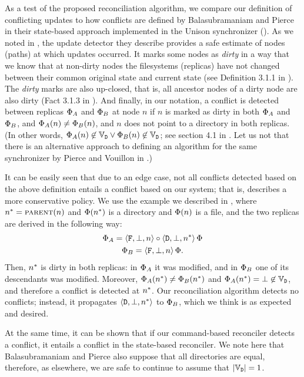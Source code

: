 As a test of the proposed reconciliation algorithm, 
we compare our definition of conflicting
updates to how conflicts are defined by Balasubramaniam and Pierce
in their state-based approach implemented in the Unison synchronizer (\cite{BP}).
As we noted in \cite{NREC}, the update detector they describe provides a safe estimate of nodes
(paths) at which updates occurred.
It marks some nodes as \emph{dirty} in a way that we know that at non-dirty nodes
the filesystems (replicas) have not changed between their common original state and current state
(see Definition 3.1.1 in \cite{BP}).
The \emph{dirty} marks are also up-closed, that is, all ancestor nodes of a dirty node
are also dirty (Fact 3.1.3 in \cite{BP}).
And finally, in our notation, 
a conflict is detected between replicas $\Phi_A$ and $\Phi_B$ at node $n$
if $n$ is marked as dirty in both $\Phi_A$ and $\Phi_B$, and
$\Phi_A(n)\neq\Phi_B(n)$, and $n$ does not point to a directory in both replicas.
(In other words, 
$\Phi_A(n)\not\in\mathbb{V}_{\mathtt{D}} \vee \Phi_B(n)\not\in\mathbb{V}_{\mathtt{D}}$; see section 4.1 in \cite{BP}.
Let us not that there is an alternative approach to defining an algorithm for
the same synchronizer by Pierce and Vouillon in \cite{PV}.)

It can be easily seen that due to an edge case, 
not all conflicts detected based on the above definition
entails a conflict based on our system; that is, \cite{BP} describes a more
conservative policy.
We use the example we described in \cite{NREC},
where $n^*=\text{\normalfont\scshape{parent}}(n)$ and $\Phi(n^*)$ is a directory and $\Phi(n)$ is a file, and
the two replicas are derived in the following way:
\begin{gather*}
\Phi_A = \langle{\mathtt{F},\bot,n}\rangle \circ \langle{\mathtt{D},\bot,n^*}\rangle \,\Phi \\
\Phi_B = \langle{\mathtt{F},\bot,n}\rangle \,\Phi.
\end{gather*}
Then, $n^*$ is dirty in both replicas:
in $\Phi_A$ it was modified, and in $\Phi_B$ one of its descendants was modified.
Moreover, $\Phi_A(n^*)\neq\Phi_B(n^*)$ and $\Phi_A(n^*)=\bot\not\in\mathbb{V}_{\mathtt{D}}$,
and therefore a conflict is detected at $n^*$.
Our reconciliation algorithm detects no conflicts;
instead, it propagates $\langle{\mathtt{D},\bot,n^*}\rangle$ to $\Phi_B$, which we think is as expected
and desired.

At the same time, it can be shown that if our command-based reconciler
detects a conflict, it entails a conflict in the state-based reconciler.
We note here that Balasubramaniam and Pierce also suppose that all directories are equal,
therefore, as elsewhere, we are safe to continue to assume that $|\mathbb{V}_{\mathtt{D}}|=1$.

